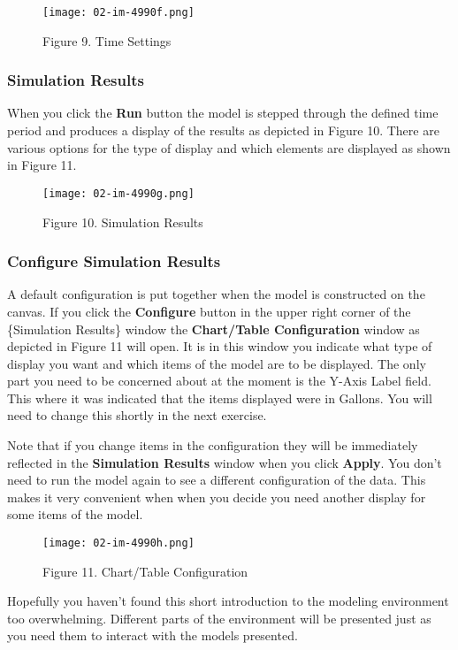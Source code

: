 \documentclass[]{memoir}
\makeatletter
\def\maxwidth{\ifdim\Gin@nat@width>\linewidth\linewidth
\else\Gin@nat@width\fi}
\let\Oldincludegraphics\includegraphics
\renewcommand{\includegraphics}[1]{\Oldincludegraphics[width=\maxwidth]{#1}}
\renewcommand{\u}[1]{\textbf{#1}}
\makeatother
\begin{document}
\begin{figure}[htbp]
\centering
\texttt{[image: 02-im-4990f.png]}
\caption{Figure 9. Time Settings}
\end{figure}

\subsubsection{Simulation Results}

When you click the \u{Run} button the model is stepped through the
defined time period and produces a display of the results as depicted in
Figure 10. There are various options for the type of display and which
elements are displayed as shown in Figure 11.

\begin{figure}[htbp]
\centering
\texttt{[image: 02-im-4990g.png]}
\caption{Figure 10. Simulation Results}
\end{figure}

\subsubsection{Configure Simulation Results}

A default configuration is put together when the model is constructed on
the canvas. If you click the \u{Configure} button in the upper right
corner of the \{Simulation Results\} window the
\u{Chart/Table Configuration} window as depicted in Figure 11 will open.
It is in this window you indicate what type of display you want and
which items of the model are to be displayed. The only part you need to
be concerned about at the moment is the Y-Axis Label field. This where
it was indicated that the items displayed were in Gallons. You will need
to change this shortly in the next exercise.

Note that if you change items in the configuration they will be
immediately reflected in the \u{Simulation Results} window when you
click \u{Apply}. You don't need to run the model again to see a
different configuration of the data. This makes it very convenient when
when you decide you need another display for some items of the model.

\begin{figure}[htbp]
\centering
\texttt{[image: 02-im-4990h.png]}
\caption{Figure 11. Chart/Table Configuration}
\end{figure}

Hopefully you haven't found this short introduction to the modeling
environment too overwhelming. Different parts of the environment will be
presented just as you need them to interact with the models presented.
\end{document}
